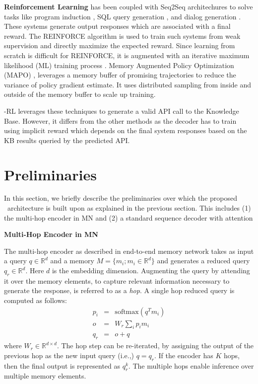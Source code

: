 \vspace{0.5ex}
\noindent\textbf{Reinforcement Learning} has been coupled with Seq2Seq architechures to solve tasks like program induction \cite{liang2017neural, zaremba2015reinforcement}, SQL query generation \cite{NIPS2018_8204, zhong2017seq2sql}, and dialog generation \cite{li2016deep}. These systems generate output responses which are associated with a final reward. The REINFORCE \cite{williams1992simple} algorithm is used to train such systems from weak supervision and directly maximize the expected reward. Since learning from scratch is difficult for REINFORCE, it is augmented with an iterative maximum likelihood (ML) training process \cite{liang2017neural}. Memory Augmented Policy Optimization (MAPO) \cite{NIPS2018_8204}, leverages a memory buffer of promising trajectories to reduce the variance of policy gradient estimate. It uses distributed sampling from inside and outside of the memory buffer to scale up  training.

\sys -RL leverages these techniques to generate a valid API call to the Knowledge Base. However, it differs from the other methods as the decoder has to train using implicit reward which depends on the final system responses based on the KB results queried by the predicted API.

\section{Preliminaries}
\label{sec:prelims}
In this section, we briefly describe the preliminaries over which the proposed \sys\ architecture is built upon as explained in the previous section. This includes (1) the multi-hop encoder in MN and (2) a standard sequence decoder with attention \cite{bahdanau2014neural}

\noindent\textbf{Multi-Hop Encoder in MN}
\label{ssec:mhencoder}

The multi-hop encoder as described in end-to-end memory network \cite{sukhbaatar2015end} takes as input a query $q \in \mathbb{R}^{d}$ and a memory $M = \{ m_i; m_i \in \mathbb{R}^{d}\}$ and generates a reduced query $q_r \in \mathbb{R}^{d}$. Here $d$ is the embedding dimension. Augmenting the query by attending it over the memory elements, to capture relevant information necessary to generate the response, is referred to as a \textit{hop}. A single hop reduced query is computed as follows:
\begin{eqnarray}
p_i &=& \text{softmax}(q^T m_i) \\
o &=& W_r \sum\nolimits_i p_i m_i \\
q_r &=& o + q
\end{eqnarray}
where $W_r \in \mathbb{R}^{d \times d}$. The hop step can be re-iterated, by assigning the output of the previous hop as the new input query (i.e.,) $q=q_r$. If the encoder has $K$ hops, then the final output is represented as $q^k_r$. The multiple hops enable inference over multiple memory elements.

